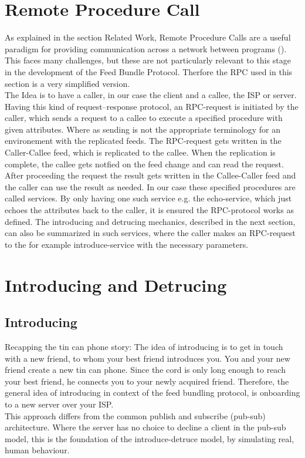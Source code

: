 \section{Remote Procedure Call}
As explained in the section Related Work, Remote Procedure Calls are a useful paradigm for providing communication across a
network between programs (\citet{birrell1984implementing}). This faces many challenges, but these are not particularly relevant to this stage in the development of the Feed Bundle Protocol. Therfore the RPC used in this section is a very simplified version.\\
The Idea is to have a caller, in our case the client and a callee, the ISP or server. Having this kind of request–response protocol, an RPC-request is initiated by the caller, which sends a request to a callee to execute a specified procedure with given attributes. Where as sending is not the appropriate terminology for an environement with the replicated feeds. The RPC-request gets written in the Caller-Callee feed, which is replicated to the callee. When the replication is complete, the callee gets notfied on the feed change and can read the request. After proceeding the request the result gets written in the Callee-Caller feed and the caller can use the result as needed. In our case these specified procedures are called services. By only having one such service e.g. the echo-service, which just echoes the attributes back to the caller, it is ensured the RPC-protocol works as defined. The introducing and detrucing mechanics, described in the next section, can also be summarized in such services, where the caller makes an RPC-request to the for example introduce-service with the necessary parameters. 

\section{Introducing and Detrucing}
\subsection{Introducing}
Recapping the tin can phone story: The idea of introducing is to get in touch with a new friend, to whom your best friend introduces you. You and your new friend create a new tin can phone. Since the cord is only long enough to reach your best friend, he connects you to your newly acquired friend. Therefore, the general idea of introducing in context of the feed bundling protocol, is onboarding to a new server over your ISP. \\This approach differs from the common publish and subscribe (pub-sub) architecture. Where the server has no choice to decline a client in the pub-sub model, this is the foundation of the introduce-detruce model, by simulating real, human behaviour. 

